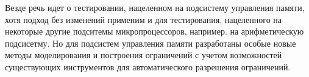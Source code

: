 Везде речь идет о тестировании, нацеленном на подсистему управления памяти, хотя подход без изменений применим и для тестирования, нацеленного на некоторые другие подситемы микропроцессоров, например. на арифметическую подсисетму. Но для подсистем управления памяти разработаны особые новые методы моделирования и построения ограничений с учетом возможностей существующих инструментов для автоматического разрешения ограничений.

%


